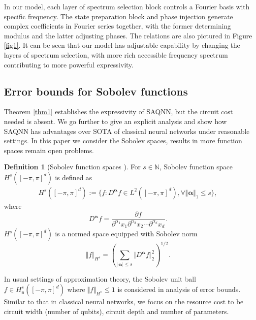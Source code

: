 \documentclass{article}
\theoremstyle{plain}
\theoremstyle{definition}
\newtheorem{definition}[theorem]{Definition}
\theoremstyle{remark}
\begin{document}
In our model, each layer of spectrum selection block controls a Fourier basis with specific frequency. The state preparation block and phase injection generate complex coefficients in Fourier series together, with the former determining modulus and the latter adjusting phases. The relations are also pictured in Figure \ref{fig1}. It can be seen that our model has adjustable capability by changing the layers of spectrum selection, with more rich accessible frequency spectrum contributing to more powerful expressivity. 

\subsection{Error bounds for Sobolev functions}
Theorem \ref{thm1} establishes the expressivity of SAQNN, but the circuit cost needed is absent. We go further to give an explicit analysis and show how SAQNN has advantages over SOTA of classical neural networks under reasonable settings. In this paper we consider the Sobolev spaces, results in more function spaces remain open problems.
\begin{definition}[Sobolev function spaces \cite{adams2003,canuto2006}]
    For $s\in \mathbb{N}$, Sobolev function space $H^s([-\pi,\pi]^d)$ is defined as
    \begin{align*}
        H^s([-\pi,\pi]^d):=\{f:D^{\boldsymbol{\alpha}}f \in L^2([-\pi,\pi]^d),\forall\Vert\boldsymbol{\alpha}\Vert_{1}\leq s\},
    \end{align*}
    where 
    \begin{equation*}
        D^{\boldsymbol{\alpha}}f=\frac{\partial f}{\partial^{\alpha_1} x_1\partial^{\alpha_2} x_2\cdots \partial^{\alpha_d} x_d}.
    \end{equation*}
    $H^s([-\pi,\pi]^d)$ is a normed space equipped with Sobolev norm
    \begin{equation*}
        \Vert f\Vert_{H^s} = (\sum_{|\boldsymbol{\alpha|}\leq s}\Vert D^{\boldsymbol{\alpha}}f\Vert_2^2)^{1/2}.
    \end{equation*}
\end{definition}


In usual settings of approximation theory, the Sobolev unit ball $f\in H^s_u([-\pi,\pi]^d)$ where $\Vert f\Vert_{H^s}\leq1$ is considered in analysis of error bounds. Similar to that in classical neural networks, we focus on the resource cost to be circuit width (number of qubits), circuit depth and number of parameters.

\thmtwo*
\end{document}

